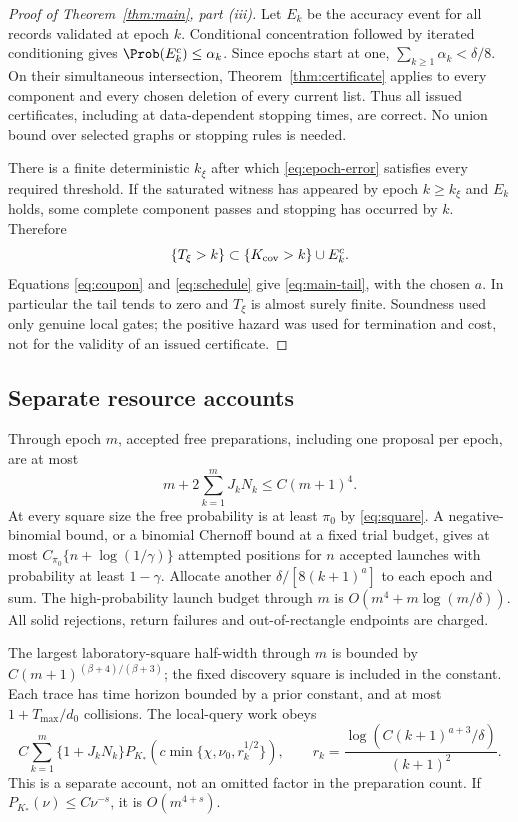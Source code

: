 \begin{proof}[Proof of Theorem~\ref{thm:main}, part (iii)]
Let $E_k$ be the accuracy event for all records validated at epoch $k$.
Conditional concentration followed by iterated conditioning gives
$\Prob(E_k^c)\le\alpha_k$. Since epochs start at one,
$\sum_{k\ge1}\alpha_k<\delta/8$. On their simultaneous intersection,
Theorem~\ref{thm:certificate} applies to every component and every
chosen deletion of every current list. Thus all issued certificates,
including at data-dependent stopping times, are correct. No union bound
over selected graphs or stopping rules is needed.

There is a finite deterministic $k_\xi$ after which
\eqref{eq:epoch-error} satisfies every required threshold. If the
saturated witness has appeared by epoch $k\ge k_\xi$ and $E_k$
holds, some complete component passes and stopping has occurred by $k$.
Therefore
\[
 \{T_\xi>k\}\subset\{K_{\rm cov}>k\}\cup E_k^c.
\]
Equations \eqref{eq:coupon} and \eqref{eq:schedule} give
\eqref{eq:main-tail}, with the chosen $a$. In particular the tail tends
to zero and $T_\xi$ is almost surely finite. Soundness used only genuine
local gates; the positive hazard was used for termination and cost, not
for the validity of an issued certificate.
\end{proof}

\subsection{Separate resource accounts}
Through epoch $m$, accepted free preparations, including one proposal
per epoch, are at most
\begin{equation}\label{eq:launch-cost}
 m+2\sum_{k=1}^m J_kN_k\le C(m+1)^4.
\end{equation}
At every square size the free probability is at least $\pi_0$ by
\eqref{eq:square}. A negative-binomial bound, or a binomial Chernoff
bound at a fixed trial budget, gives at most
$C_{\pi_0}\{n+\log(1/\gamma)\}$ attempted positions for $n$ accepted
launches with probability at least $1-\gamma$. Allocate another
$\delta/[8(k+1)^a]$ to each epoch and sum. The high-probability launch
budget through $m$ is
$O(m^4+m\log(m/\delta))$. All solid rejections, return failures and
out-of-rectangle endpoints are charged.

The largest laboratory-square half-width through $m$ is bounded by
$C(m+1)^{(\beta+4)/(\beta+3)}$; the fixed discovery square is included
in the constant. Each trace has time horizon bounded by a prior constant,
and at most $1+T_{\max}/d_0$ collisions. The local-query work obeys
\begin{equation}\label{eq:probe-cost}
 C\sum_{k=1}^m\{1+J_kN_k\}
 P_{K_*}\!\left(c\min\{\chi,\nu_0,r_k^{1/2}\}\right),\qquad
 r_k=\frac{\log(C(k+1)^{a+3}/\delta)}{(k+1)^2}.
\end{equation}
This is a separate account, not an omitted factor in the preparation
count. If $P_{K_*}(\nu)\le C\nu^{-s}$, it is $O(m^{4+s})$.

